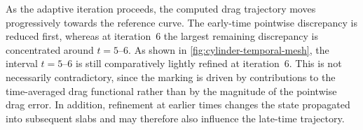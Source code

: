 As the adaptive iteration proceeds, the computed drag trajectory moves progressively towards the reference curve. The early-time pointwise discrepancy is reduced first, whereas at iteration~6 the largest remaining discrepancy is concentrated around \(t=5\)--\(6\). 
As shown in \cref{fig:cylinder-temporal-mesh}, the interval \(t=5\)--\(6\) is still comparatively lightly refined at iteration~6. This is not necessarily contradictory, since the marking is driven by contributions to the time-averaged drag functional rather than by the magnitude of the pointwise drag error. In addition, refinement at earlier times changes the state propagated into subsequent slabs and may therefore also influence the late-time trajectory.



